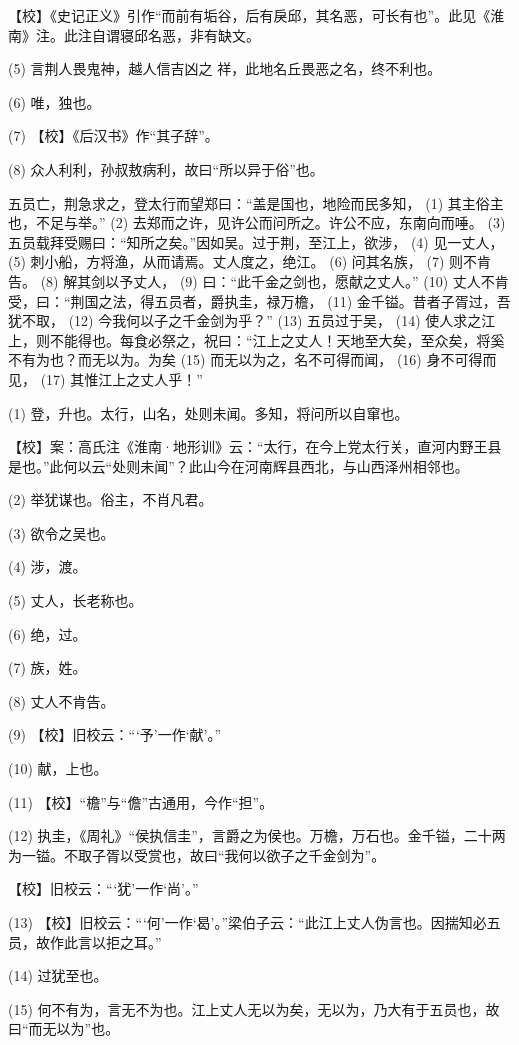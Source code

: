 \documentclass[12pt,UTF8]{ctexbook}
\begin{document}
【校】《史记正义》引作“而前有垢谷，后有戾邱，其名恶，可长有也”。此见《淮南》注。此注自谓寝邱名恶，非有缺文。

(5) 言荆人畏鬼神，越人信吉凶之 祥，此地名丘畏恶之名，终不利也。

(6) 唯，独也。

(7) 【校】《后汉书》作“其子辞”。

(8) 众人利利，孙叔敖病利，故曰“所以异于俗”也。

五员亡，荆急求之，登太行而望郑曰：“盖是国也，地险而民多知， (1) 其主俗主也，不足与举。” (2) 去郑而之许，见许公而问所之。许公不应，东南向而唾。 (3) 五员载拜受赐曰：“知所之矣。”因如吴。过于荆，至江上，欲涉， (4) 见一丈人， (5) 刺小船，方将渔，从而请焉。丈人度之，绝江。 (6) 问其名族， (7) 则不肯告。 (8) 解其剑以予丈人， (9) 曰：“此千金之剑也，愿献之丈人。” (10) 丈人不肯受，曰：“荆国之法，得五员者，爵执圭，禄万檐， (11) 金千镒。昔者子胥过，吾犹不取， (12) 今我何以子之千金剑为乎？” (13) 五员过于吴， (14) 使人求之江上，则不能得也。每食必祭之，祝曰：“江上之丈人！天地至大矣，至众矣，将奚不有为也？而无以为。为矣 (15) 而无以为之，名不可得而闻， (16) 身不可得而见， (17) 其惟江上之丈人乎！”

(1) 登，升也。太行，山名，处则未闻。多知，将问所以自窜也。

【校】案：高氏注《淮南·地形训》云：“太行，在今上党太行关，直河内野王县是也。”此何以云“处则未闻”？此山今在河南辉县西北，与山西泽州相邻也。

(2) 举犹谋也。俗主，不肖凡君。

(3) 欲令之吴也。

(4) 涉，渡。

(5) 丈人，长老称也。

(6) 绝，过。

(7) 族，姓。

(8) 丈人不肯告。

(9) 【校】旧校云：“‘予’一作‘献’。”

(10) 献，上也。

(11) 【校】“檐”与“儋”古通用，今作“担”。

(12) 执圭，《周礼》“侯执信圭”，言爵之为侯也。万檐，万石也。金千镒，二十两为一镒。不取子胥以受赏也，故曰“我何以欲子之千金剑为”。

【校】旧校云：“‘犹’一作‘尚’。”

(13) 【校】旧校云：“‘何’一作‘曷’。”梁伯子云：“此江上丈人伪言也。因揣知必五员，故作此言以拒之耳。”

(14) 过犹至也。

(15) 何不有为，言无不为也。江上丈人无以为矣，无以为，乃大有于五员也，故曰“而无以为”也。
\end{document}
